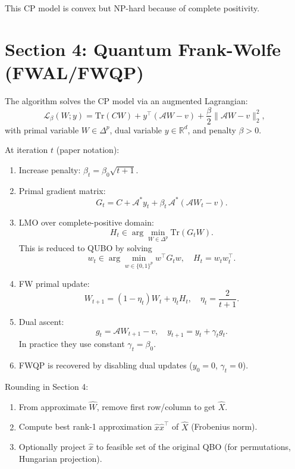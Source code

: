 \documentclass[11pt]{article}
\begin{document}
This CP model is convex but NP-hard because of complete positivity.

\section{Section 4: Quantum Frank-Wolfe (FWAL/FWQP)}
The algorithm solves the CP model via an augmented Lagrangian:
\begin{equation}
\mathcal{L}_{\beta}(W; y) = \mathrm{Tr}(CW) + y^\top(\mathcal{A}W-v) + \frac{\beta}{2}\|\mathcal{A}W-v\|_2^2,
\end{equation}
with primal variable $W \in \Delta^p$, dual variable $y \in \mathbb{R}^d$, and penalty $\beta>0$.

At iteration $t$ (paper notation):
\begin{enumerate}
\item Increase penalty: $\beta_t = \beta_0\sqrt{t+1}$.
\item Primal gradient matrix:
\begin{equation}
G_t = C + \mathcal{A}^\ast y_t + \beta_t\,\mathcal{A}^\ast(\mathcal{A}W_t - v).
\end{equation}
\item LMO over complete-positive domain:
\begin{equation}
H_t \in \arg\min_{W\in\Delta^p} \mathrm{Tr}(G_tW).
\end{equation}
This is reduced to QUBO by solving
\begin{equation}
w_t \in \arg\min_{w\in\{0,1\}^p} w^\top G_t w,
\quad H_t = w_t w_t^\top.
\end{equation}
\item FW primal update:
\begin{equation}
W_{t+1} = (1-\eta_t)W_t + \eta_t H_t,
\quad \eta_t = \frac{2}{t+1}.
\end{equation}
\item Dual ascent:
\begin{equation}
g_t = \mathcal{A}W_{t+1} - v,
\quad y_{t+1} = y_t + \gamma_t g_t.
\end{equation}
In practice they use constant $\gamma_t=\beta_0$.
\item FWQP is recovered by disabling dual updates ($y_0=0$, $\gamma_t=0$).
\end{enumerate}

Rounding in Section 4:
\begin{enumerate}
\item From approximate $\hat W$, remove first row/column to get $\hat X$.
\item Compute best rank-1 approximation $\hat x\hat x^\top$ of $\hat X$ (Frobenius norm).
\item Optionally project $\hat x$ to feasible set of the original QBO (for permutations, Hungarian projection).
\end{enumerate}
\end{document}
